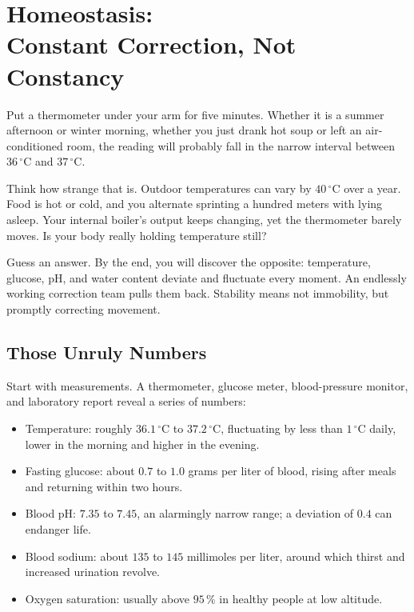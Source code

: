 \chapter[Homeostasis: Constant Correction, Not Constancy]{Homeostasis:\protect\\ Constant Correction, Not Constancy}

\begin{kaichang}
Put a thermometer under your arm for five minutes. Whether it is a summer afternoon or winter morning, whether you just drank hot soup or left an air-conditioned room, the reading will probably fall in the narrow interval between $36\,^{\circ}\mathrm{C}$ and $37\,^{\circ}\mathrm{C}$.

Think how strange that is. Outdoor temperatures can vary by $40\,^{\circ}\mathrm{C}$ over a year. Food is hot or cold, and you alternate sprinting a hundred meters with lying asleep. Your internal boiler's output keeps changing, yet the thermometer barely moves. Is your body really holding temperature still?

Guess an answer. By the end, you will discover the opposite: temperature, glucose, pH, and water content deviate and fluctuate every moment. An endlessly working correction team pulls them back. Stability means not immobility, but promptly correcting movement.
\end{kaichang}

\section{Those Unruly Numbers}

Start with measurements. A thermometer, glucose meter, blood-pressure monitor, and laboratory report reveal a series of numbers:

\begin{itemize}[itemsep=2pt]
\item Temperature: roughly $36.1\,^{\circ}\mathrm{C}$ to $37.2\,^{\circ}\mathrm{C}$, fluctuating by less than $1\,^{\circ}\mathrm{C}$ daily, lower in the morning and higher in the evening.
\item Fasting glucose: about $0.7$ to $1.0$ grams per liter of blood, rising after meals and returning within two hours.
\item Blood pH: $7.35$ to $7.45$, an alarmingly narrow range; a deviation of $0.4$ can endanger life.
\item Blood sodium: about $135$ to $145$ millimoles per liter, around which thirst and increased urination revolve.
\item Oxygen saturation: usually above $95\,\%$ in healthy people at low altitude.
\end{itemize}

